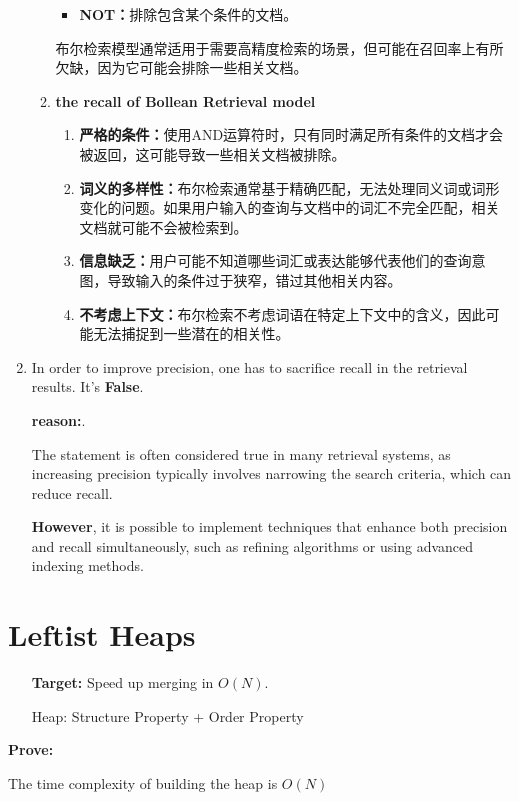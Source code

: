 \documentclass{article}
\begin{document}
\begin{enumerate}
\begin{enumerate}
\begin{itemize}
            \item \textbf{NOT：}排除包含某个条件的文档。
        \end{itemize}
        布尔检索模型通常适用于需要高精度检索的场景，但可能在召回率上有所欠缺，因为它可能会排除一些相关文档。
        \item \textbf{the recall of Bollean Retrieval model}
        \begin{enumerate}
            \item \textbf{严格的条件：}使用AND运算符时，只有同时满足所有条件的文档才会被返回，这可能导致一些相关文档被排除。
            \item \textbf{词义的多样性：}布尔检索通常基于精确匹配，无法处理同义词或词形变化的问题。如果用户输入的查询与文档中的词汇不完全匹配，相关文档就可能不会被检索到。
            \item \textbf{信息缺乏：}用户可能不知道哪些词汇或表达能够代表他们的查询意图，导致输入的条件过于狭窄，错过其他相关内容。
            \item \textbf{不考虑上下文：}布尔检索不考虑词语在特定上下文中的含义，因此可能无法捕捉到一些潜在的相关性。
        \end{enumerate}
    \end{enumerate}
    \item In order to improve precision, one has to sacrifice recall in the retrieval results. It's \textbf{False}.\par
    \textbf{reason:}.\par
    The statement is often considered true in many retrieval systems, as increasing precision typically involves narrowing the search criteria, which can reduce recall. \par
    \textbf{However}, it is possible to implement techniques that enhance both precision and recall simultaneously, such as refining algorithms or using advanced indexing methods. 
\end{enumerate}

\newpage

\section{Leftist Heaps}
\hypertarget{Leftist}{}
\begin{itemize}
    \item [\textbf{Target:}] Speed up merging in $O(N)$.
    \item [Heap:] Structure Property + Order Property
\end{itemize} 
\textbf{Prove:}\par
The time complexity of building the heap is $O(N)$
\end{document}
